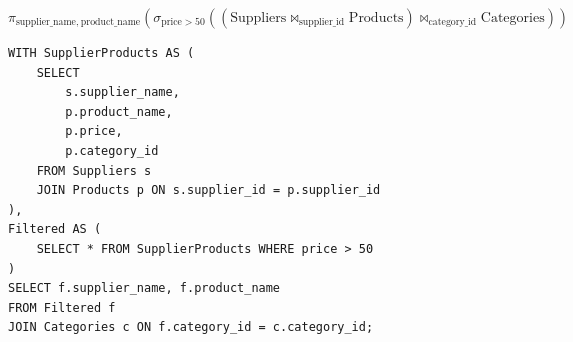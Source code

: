 \documentclass{article}
\begin{document}
\newpage
{}
\[
\pi_{\text{supplier\_name},\ \text{product\_name}} \left(
  \sigma_{\text{price} > 50} \left(
    \left(
      \text{Suppliers} \bowtie_{\text{supplier\_id}} \text{Products}
    \right)
    \bowtie_{\text{category\_id}} \text{Categories}
  \right)
\right)
\]

\begin{verbatim}
WITH SupplierProducts AS (
    SELECT 
        s.supplier_name, 
        p.product_name, 
        p.price, 
        p.category_id
    FROM Suppliers s
    JOIN Products p ON s.supplier_id = p.supplier_id
),
Filtered AS (
    SELECT * FROM SupplierProducts WHERE price > 50
)
SELECT f.supplier_name, f.product_name
FROM Filtered f
JOIN Categories c ON f.category_id = c.category_id;
\end{verbatim}
\end{document}
